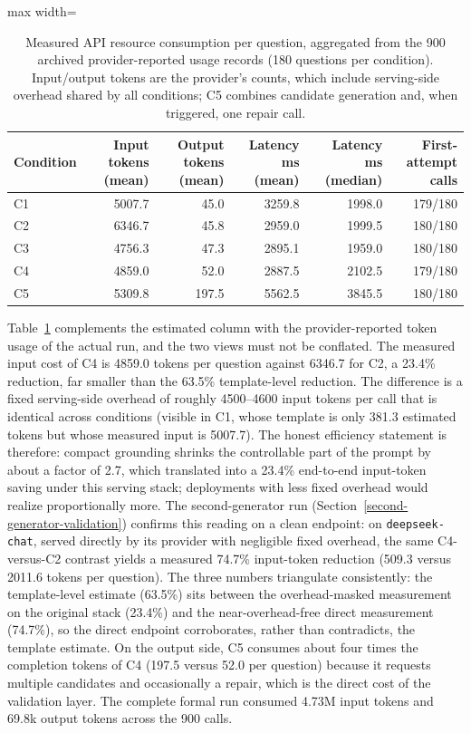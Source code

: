\documentclass[cmc,article,submit,moreauthors,pdftex]{Definitions/tsp}
\begin{document}
\begin{table}[H]
\tablesize{\small}
\caption{Measured API resource consumption per question, aggregated from the 900 archived provider-reported usage records (180 questions per condition). Input/output tokens are the provider's counts, which include serving-side overhead shared by all conditions; C5 combines candidate generation and, when triggered, one repair call.}
\label{tab:real-tokens}
\centering
\begin{adjustbox}{max width=\textwidth}
\begin{tabular}{lrrrrr}
\toprule
\textbf{Condition} & \textbf{Input tokens (mean)} & \textbf{Output tokens (mean)} & \textbf{Latency ms (mean)} & \textbf{Latency ms (median)} & \textbf{First-attempt calls} \\
\midrule
C1 & 5007.7 & 45.0 & 3259.8 & 1998.0 & 179/180 \\
C2 & 6346.7 & 45.8 & 2959.0 & 1999.5 & 180/180 \\
C3 & 4756.3 & 47.3 & 2895.1 & 1959.0 & 180/180 \\
C4 & 4859.0 & 52.0 & 2887.5 & 2102.5 & 179/180 \\
C5 & 5309.8 & 197.5 & 5562.5 & 3845.5 & 180/180 \\
\bottomrule
\end{tabular}
\end{adjustbox}
\end{table}

Table~\ref{tab:real-tokens} complements the estimated column with the provider-reported token usage of the actual run, and the two views must not be conflated. The measured input cost of C4 is 4859.0 tokens per question against 6346.7 for C2, a 23.4\% reduction, far smaller than the 63.5\% template-level reduction. The difference is a fixed serving-side overhead of roughly 4500--4600 input tokens per call that is identical across conditions (visible in C1, whose template is only 381.3 estimated tokens but whose measured input is 5007.7). The honest efficiency statement is therefore: compact grounding shrinks the controllable part of the prompt by about a factor of 2.7, which translated into a 23.4\% end-to-end input-token saving under this serving stack; deployments with less fixed overhead would realize proportionally more. The second-generator run (Section~\ref{second-generator-validation}) confirms this reading on a clean endpoint: on \texttt{deepseek-chat}, served directly by its provider with negligible fixed overhead, the same C4-versus-C2 contrast yields a measured 74.7\% input-token reduction (509.3 versus 2011.6 tokens per question). The three numbers triangulate consistently: the template-level estimate (63.5\%) sits between the overhead-masked measurement on the original stack (23.4\%) and the near-overhead-free direct measurement (74.7\%), so the direct endpoint corroborates, rather than contradicts, the template estimate. On the output side, C5 consumes about four times the completion tokens of C4 (197.5 versus 52.0 per question) because it requests multiple candidates and occasionally a repair, which is the direct cost of the validation layer. The complete formal run consumed 4.73M input tokens and 69.8k output tokens across the 900 calls.
\end{document}
